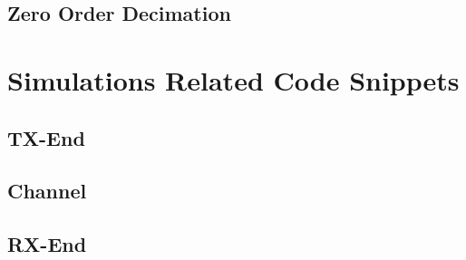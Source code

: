 \documentclass[]{article}
\begin{document}
\subsection{Zero Order Decimation}
\label{app:ad}


\section{Simulations Related Code Snippets}
\subsection{TX-End}
\label{app:TX_snip}

\subsection{Channel}
\label{app:chan_snip}

\subsection{RX-End}
\label{app:RX_snip}

\end{document}
